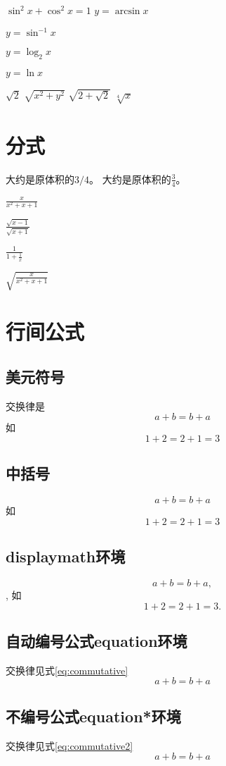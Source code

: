 \documentclass{article}%
\begin{document}
	$\sin^2 x + \cos^2 x = 1$
	$y = \arcsin x$
	
	$y = \sin^{-1} x$ 
	
	$y = \log_2 x$
	
	$y = \ln x$
	
	$\sqrt{2}$
	$\sqrt{x^2 + y^2}$
	$\sqrt{2 + \sqrt{2}}$
	$\sqrt[4]{x}$ %
	\section{分式}
	大约是原体积的$3/4$。
	大约是原体积的$\frac{3}{4}$。
	
	$\frac{x}{x^2 + x +1}$
	
	$\frac{\sqrt{x-1}}{\sqrt{x+1}}$
	
	$\frac{1}{1+ \frac{1}{x}}$
	
	$\sqrt{\frac{x}{x^2 + x + 1}}$

	\section{行间公式}
	\subsection{美元符号}
	交换律是 $$a+b=b+a$$
	如 $$1+2=2+1=3$$
	\subsection{中括号}
	 \[a+b=b+a\]
	 如
	 \[1+2=2+1=3\]
	\subsection{displaymath环境}
	\begin{displaymath}
		a+b=b+a,
	\end{displaymath},
	如
	\begin{displaymath}
		1+2=2+1=3.
	\end{displaymath}
	\subsection{自动编号公式equation环境}
	交换律见式\ref{eq:commutative}
	\begin{equation}
		a+b=b+a \label{eq:commutative}
	\end{equation}
	\subsection{不编号公式equation*环境}
	交换律见式\ref{eq:commutative2}
	\begin{equation*}
	a+b=b+a \label{eq:commutative2}
	\end{equation*}
\end{document}
